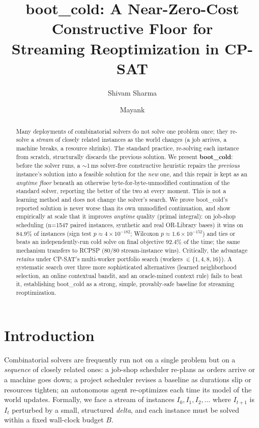 \documentclass[11pt]{article}                        %
\title{\textbf{boot\_cold}: A Near-Zero-Cost Constructive Floor for\\
Streaming Reoptimization in CP-SAT}
\author{Shivam Sharma \and Mayank}
\date{}
\begin{document}
\maketitle

\begin{abstract}
Many deployments of combinatorial solvers do not solve one problem once; they
re-solve a \emph{stream} of closely related instances as the world changes (a
job arrives, a machine breaks, a resource shrinks). The standard practice,
re-solving each instance from scratch, structurally discards the previous
solution. We present \textbf{boot\_cold}: before the solver runs, a
$\sim$1\,ms solver-free constructive heuristic repairs the \emph{previous}
instance's solution into a feasible solution for the \emph{new} one, and this
repair is kept as an \emph{anytime floor} beneath an otherwise
byte-for-byte-unmodified continuation of the standard solver, reporting the
better of the two at every moment. This is not a learning method and does not
change the solver's search. We prove boot\_cold's reported solution is never
worse than its own unmodified continuation, and show empirically at scale that
it improves \emph{anytime} quality (primal integral): on job-shop scheduling
(n{=}1547 paired instances, synthetic and real OR-Library bases) it wins on
84.9\% of instances (sign test $p{\approx}4{\times}10^{-182}$; Wilcoxon
$p{\approx}1.6{\times}10^{-152}$) and ties or beats an independently-run cold
solve on final objective 92.4\% of the time; the same mechanism transfers to
RCPSP (80/80 stream-instance wins). Critically, the advantage \emph{retains}
under CP-SAT's multi-worker portfolio search (workers $\in\{1,4,8,16\}$). A systematic search over three more sophisticated
alternatives (learned neighborhood selection, an online contextual bandit,
and an oracle-mined context rule) fails to beat it, establishing boot\_cold as
a strong, simple, provably-safe baseline for streaming reoptimization.
\end{abstract}

\section{Introduction}
\label{sec:intro}

Combinatorial solvers are frequently run not on a single problem but on a
\emph{sequence} of closely related ones: a job-shop scheduler re-plans as
orders arrive or a machine goes down; a project scheduler revises a baseline
as durations slip or resources tighten; an autonomous agent re-optimizes each
time its model of the world updates. Formally, we face a stream of instances
$I_0, I_1, I_2, \dots$ where $I_{t+1}$ is $I_t$ perturbed by a small,
structured \emph{delta}, and each instance must be solved within a fixed
wall-clock budget $B$.
\end{document}
